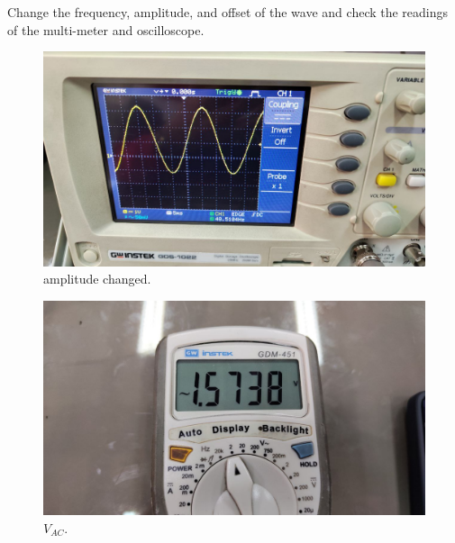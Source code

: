 \documentclass[11pt]{article}
\newcommand{\PicScale}{0.2}
\begin{document}
\begin{question}
\begin{subquestion}{Change the frequency, amplitude, and offset of the wave and check the readings of the multi-meter and oscilloscope.}
{    \begin{figure}[H]
        \begin{center}
            \includegraphics[scale=\PicScale]{Fig/24.jpeg}
            \caption{amplitude changed.}
        \end{center}
    \end{figure}
    \begin{figure}[H]
        \begin{center}
            \includegraphics[scale=\PicScale]{Fig/25.jpeg}
            \caption{$V_{AC}$.}
        \end{center}
    \end{figure}

}
\end{subquestion}
\end{question}
\end{document}
